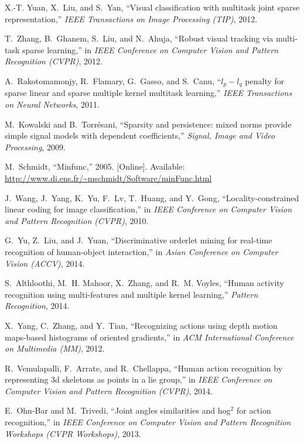\documentclass[9pt,technote,compsoc]{IEEEtran}
\begin{document}
\begin{thebibliography}{10}
	X.-T. Yuan, X.~Liu, and S.~Yan, ``Visual classification with multitask joint
	sparse representation,'' \emph{IEEE Transactions on Image Processing (TIP)},
	2012.
	
	T.~Zhang, B.~Ghanem, S.~Liu, and N.~Ahuja, ``Robust visual tracking via
	multi-task sparse learning,'' in \emph{IEEE Conference on Computer Vision and
		Pattern Recognition (CVPR)}, 2012.
	
	A.~Rakotomamonjy, R.~Flamary, G.~Gasso, and S.~Canu, ``$l_p-l_q$ penalty for
	sparse linear and sparse multiple kernel multitask learning,'' \emph{IEEE
		Transactions on Neural Networks}, 2011.
	
	M.~Kowalski and B.~Torrésani, ``Sparsity and persistence: mixed norms provide
	simple signal models with dependent coefficients,'' \emph{Signal, Image and
		Video Processing}, 2009.
	
	\BIBentryALTinterwordspacing
	M.~Schmidt, ``Minfunc,'' 2005. [Online]. Available:
	\url{http://www.di.ens.fr/~mschmidt/Software/minFunc.html}
	\BIBentrySTDinterwordspacing
	
	J.~Wang, J.~Yang, K.~Yu, F.~Lv, T.~Huang, and Y.~Gong, ``Locality-constrained
	linear coding for image classification,'' in \emph{IEEE Conference on
		Computer Vision and Pattern Recognition (CVPR)}, 2010.
	
	G.~Yu, Z.~Liu, and J.~Yuan, ``Discriminative orderlet mining for real-time
	recognition of human-object interaction,'' in \emph{Asian Conference on
		Computer Vision (ACCV)}, 2014.
	
	S.~Althloothi, M.~H. Mahoor, X.~Zhang, and R.~M. Voyles, ``Human activity
	recognition using multi-features and multiple kernel learning,''
	\emph{Pattern Recognition}, 2014.
	
	X.~Yang, C.~Zhang, and Y.~Tian, ``Recognizing actions using depth motion
	maps-based histograms of oriented gradients,'' in \emph{ACM International
		Conference on Multimedia (MM)}, 2012.
	
	R.~Vemulapalli, F.~Arrate, and R.~Chellappa, ``Human action recognition by
	representing 3d skeletons as points in a lie group,'' in \emph{IEEE
		Conference on Computer Vision and Pattern Recognition (CVPR)}, 2014.
	
	E.~Ohn-Bar and M.~Trivedi, ``Joint angles similarities and hog$^2$ for action
	recognition,'' in \emph{IEEE Conference on Computer Vision and Pattern
		Recognition Workshops (CVPR Workshops)}, 2013.
	

\end{thebibliography}
\end{document}
